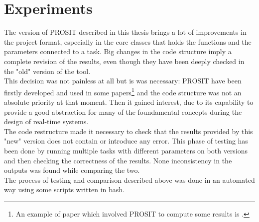 \chapter{Experiments}\label{chp:experiments}


The version of PROSIT described in this thesis brings a lot of improvements in the project format, especially in the core classes that holds the functions and the parameters connected to a task. Big changes in the code structure imply a complete revision of the results, even though they have been deeply checked in the "old" version of the tool.\\
This decision was not painless at all but is was necessary: PROSIT have been firstly developed and used in some papers\footnote{An example of paper which involved PROSIT to compute some results is \cite{probGuarantees}.} and the code structure was not an absolute priority at that moment. Then it gained interest, due to its capability to provide a good abstraction for many of the foundamental concepts during the design of real-time systems.\\
The code restructure made it necessary to check that the results provided by this "new" version does not contain or introduce any error. This phase of testing has been done by running multiple tasks with different parameters on both versions and then checking the correctness of the results. None inconsistency in the outputs was found while comparing the two.\\
The process of testing and comparison described above was done in an automated way using some scripts written in bash.


